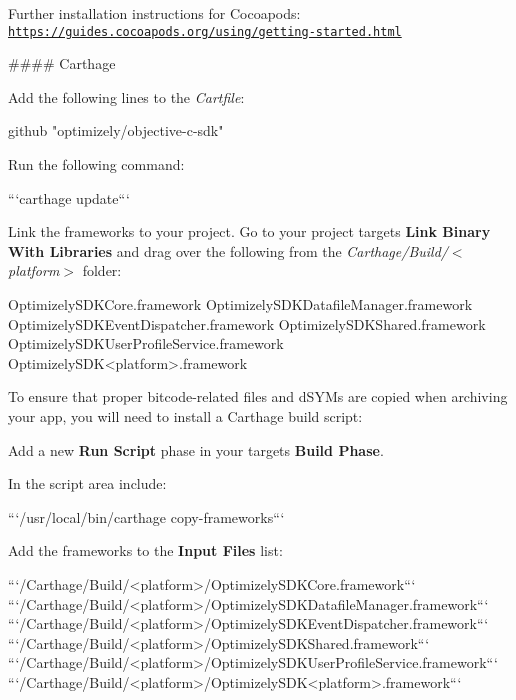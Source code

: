 Further installation instructions for Cocoapods\+: \href{https://guides.cocoapods.org/using/getting-started.html}{\tt https\+://guides.\+cocoapods.\+org/using/getting-\/started.\+html}

\#\#\#\# Carthage
\begin{DoxyEnumerate}
\item Add the following lines to the {\itshape Cartfile}\+:
\begin{DoxyPre} 
github "optimizely/objective-c-sdk"
\end{DoxyPre}

\item Run the following command\+:
\begin{DoxyPre}```carthage update```\end{DoxyPre}

\item Link the frameworks to your project. Go to your project target\textquotesingle{}s {\bfseries Link Binary With Libraries} and drag over the following from the {\itshape Carthage/\+Build/$<$platform$>$} folder\+: 
\begin{DoxyPre} 
      OptimizelySDKCore.framework
      OptimizelySDKDatafileManager.framework
      OptimizelySDKEventDispatcher.framework
      OptimizelySDKShared.framework
      OptimizelySDKUserProfileService.framework
      OptimizelySDK<platform>.framework\end{DoxyPre}

\item To ensure that proper bitcode-\/related files and d\+S\+Y\+Ms are copied when archiving your app, you will need to install a Carthage build script\+:
\begin{DoxyItemize}
\item Add a new {\bfseries Run Script} phase in your target\textquotesingle{}s {\bfseries Build Phase}.
\item In the script area include\+:
\begin{DoxyPre}
      ```/usr/local/bin/carthage copy-frameworks```\end{DoxyPre}

\item Add the frameworks to the {\bfseries Input Files} list\+:
\begin{DoxyPre}
            ```/Carthage/Build/<platform>/OptimizelySDKCore.framework```
            ```/Carthage/Build/<platform>/OptimizelySDKDatafileManager.framework```
            ```/Carthage/Build/<platform>/OptimizelySDKEventDispatcher.framework```
            ```/Carthage/Build/<platform>/OptimizelySDKShared.framework```
            ```/Carthage/Build/<platform>/OptimizelySDKUserProfileService.framework```
            ```/Carthage/Build/<platform>/OptimizelySDK<platform>.framework```\end{DoxyPre}

\end{DoxyItemize}
\end{DoxyEnumerate}

